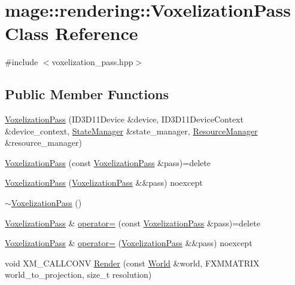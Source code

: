 \hypertarget{classmage_1_1rendering_1_1_voxelization_pass}{}\section{mage\+:\+:rendering\+:\+:Voxelization\+Pass Class Reference}
\label{classmage_1_1rendering_1_1_voxelization_pass}


{\ttfamily \#include $<$voxelization\+\_\+pass.\+hpp$>$}

\subsection*{Public Member Functions}
\begin{DoxyCompactItemize}
\item 
\mbox{\hyperlink{classmage_1_1rendering_1_1_voxelization_pass_a5ffb9a465e954b6795bc49dfdd8a21d8}{Voxelization\+Pass}} (I\+D3\+D11\+Device \&device, I\+D3\+D11\+Device\+Context \&device\+\_\+context, \mbox{\hyperlink{classmage_1_1rendering_1_1_state_manager}{State\+Manager}} \&state\+\_\+manager, \mbox{\hyperlink{classmage_1_1rendering_1_1_resource_manager}{Resource\+Manager}} \&resource\+\_\+manager)
\item 
\mbox{\hyperlink{classmage_1_1rendering_1_1_voxelization_pass_a74f9898700c2d2877ec663fe23a85670}{Voxelization\+Pass}} (const \mbox{\hyperlink{classmage_1_1rendering_1_1_voxelization_pass}{Voxelization\+Pass}} \&pass)=delete
\item 
\mbox{\hyperlink{classmage_1_1rendering_1_1_voxelization_pass_abbdf28fc21b6b4fe4eebf8ed02ac015d}{Voxelization\+Pass}} (\mbox{\hyperlink{classmage_1_1rendering_1_1_voxelization_pass}{Voxelization\+Pass}} \&\&pass) noexcept
\item 
\mbox{\hyperlink{classmage_1_1rendering_1_1_voxelization_pass_ab989ce6ec60745d7339a1288554dd400}{$\sim$\+Voxelization\+Pass}} ()
\item 
\mbox{\hyperlink{classmage_1_1rendering_1_1_voxelization_pass}{Voxelization\+Pass}} \& \mbox{\hyperlink{classmage_1_1rendering_1_1_voxelization_pass_a30bf15dac8660764cd1342a4f397e47e}{operator=}} (const \mbox{\hyperlink{classmage_1_1rendering_1_1_voxelization_pass}{Voxelization\+Pass}} \&pass)=delete
\item 
\mbox{\hyperlink{classmage_1_1rendering_1_1_voxelization_pass}{Voxelization\+Pass}} \& \mbox{\hyperlink{classmage_1_1rendering_1_1_voxelization_pass_ac7beb95fbf6fd85355703854ac282e91}{operator=}} (\mbox{\hyperlink{classmage_1_1rendering_1_1_voxelization_pass}{Voxelization\+Pass}} \&\&pass) noexcept
\item 
void X\+M\+\_\+\+C\+A\+L\+L\+C\+O\+NV \mbox{\hyperlink{classmage_1_1rendering_1_1_voxelization_pass_a29854c8eeb03975172a56ff6c61f1b60}{Render}} (const \mbox{\hyperlink{classmage_1_1rendering_1_1_world}{World}} \&world, F\+X\+M\+M\+A\+T\+R\+IX world\+\_\+to\+\_\+projection, size\+\_\+t resolution)
\end{DoxyCompactItemize}
